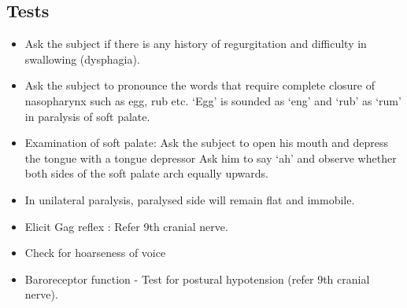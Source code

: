 \documentclass[a4paper,12pt,openany,oneside]{book}
\begin{document}
\subsection*{Tests}
\begin{itemize}
\item[]Ask the subject if there is any history of regurgitation and difficulty in swallowing (dysphagia).
\item[]Ask the subject to pronounce the words that require complete closure of nasopharynx such as egg, rub etc. ‘Egg’ is sounded as ‘eng’ and ‘rub’ as ‘rum’ in paralysis of soft palate.
\item[]Examination of soft palate: Ask the subject to open his mouth and depress the tongue with a tongue depressor Ask him to say ‘ah’ and observe whether both sides of the soft palate arch equally upwards.
\item[]In unilateral paralysis, paralysed side will remain flat and immobile.
\item[]Elicit Gag reflex : Refer 9th cranial nerve.
\item[]Check for hoarseness of voice
\item[]Baroreceptor function - Test for postural hypotension (refer 9th cranial nerve).
\end{itemize}
\end{document}
